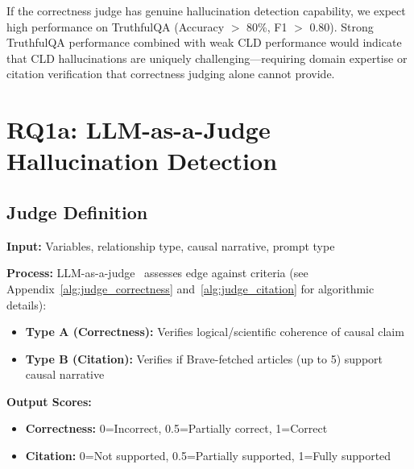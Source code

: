 If the correctness judge has genuine hallucination detection capability, we expect high performance on TruthfulQA (Accuracy $>$ 80\%, F1 $>$ 0.80). Strong TruthfulQA performance combined with weak CLD performance would indicate that CLD hallucinations are uniquely challenging---requiring domain expertise or citation verification that correctness judging alone cannot provide.

\section{RQ1a: LLM-as-a-Judge Hallucination Detection}

\subsection{Judge Definition}
\textbf{Input:} Variables, relationship type, causal narrative, prompt type

\textbf{Process:} LLM-as-a-judge~\cite{zheng2024llmasajudge} assesses edge against criteria (see Appendix~\ref{alg:judge_correctness} and~\ref{alg:judge_citation} for algorithmic details):
\begin{itemize}[noitemsep]
    \item \textbf{Type A (Correctness):} Verifies logical/scientific coherence of causal claim
    \item \textbf{Type B (Citation):} Verifies if Brave-fetched articles (up to 5) support causal narrative
\end{itemize}

\textbf{Output Scores:}
\begin{itemize}[noitemsep]
    \item \textbf{Correctness:} 0=Incorrect, 0.5=Partially correct, 1=Correct
    \item \textbf{Citation:} 0=Not supported, 0.5=Partially supported, 1=Fully supported
\end{itemize}

